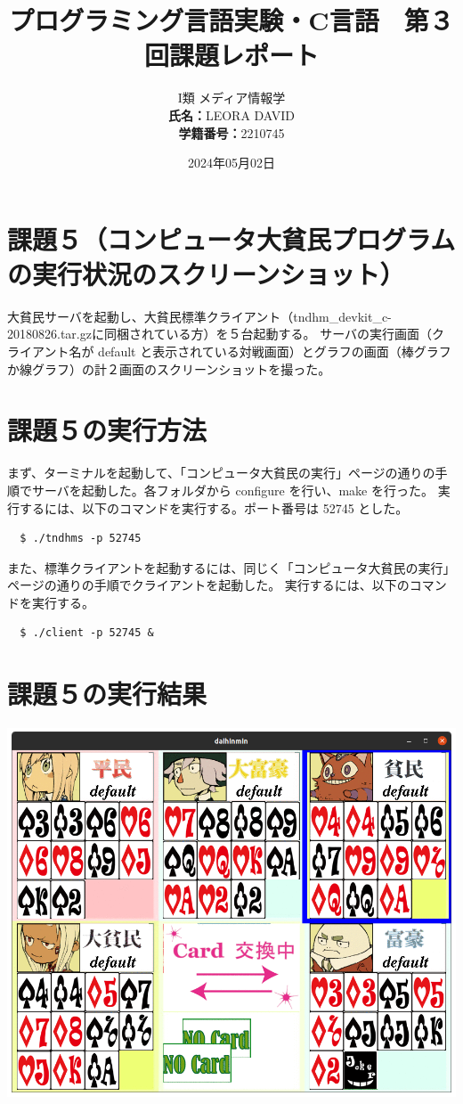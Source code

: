 \documentclass[]{jsarticle}
\title{\vspace{-3cm} プログラミング言語実験・C言語　第３回課題レポート}
\author{I類 メディア情報学 \\\textbf{氏名：}LEORA DAVID\\\textbf{学籍番号：}2210745}
\date{2024年05月02日}
\begin{document}
\maketitle

\section*{課題５（コンピュータ大貧民プログラムの実行状況のスクリーンショット）}
大貧民サーバを起動し、大貧民標準クライアント（tndhm\_devkit\_c-20180826.tar.gzに同梱されている方）を５台起動する。
サーバの実行画面（クライアント名が default と表示されている対戦画面）とグラフの画面（棒グラフか線グラフ）の計２画面のスクリーンショットを撮った。\\

\section*{課題５の実行方法}
まず、ターミナルを起動して、「コンピュータ大貧民の実行」ページの通りの手順でサーバを起動した。各フォルダから configure を行い、make を行った。
実行するには、以下のコマンドを実行する。ポート番号は 52745 とした。
\begin{lstlisting}
  $ ./tndhms -p 52745
\end{lstlisting}

\vspace*{1\baselineskip}

また、標準クライアントを起動するには、同じく「コンピュータ大貧民の実行」ページの通りの手順でクライアントを起動した。
実行するには、以下のコマンドを実行する。
\begin{lstlisting}
  $ ./client -p 52745 &
\end{lstlisting}

\section*{課題５の実行結果}

  \includegraphics[width=\textwidth]{kadai5/1.png}
\end{document}
